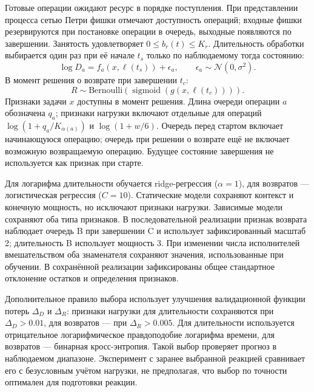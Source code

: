 \documentclass[runningheads]{llncs}
\begin{document}
Готовые операции ожидают ресурс в порядке поступления. При представлении процесса сетью Петри фишки отмечают доступность операций; входные фишки резервируются при постановке операции в очередь, выходные появляются по завершении. Занятость удовлетворяет $0\leq b_r(t)\leq K_r$. Длительность обработки выбирается один раз при её начале $t_s$ только по наблюдаемому тогда состоянию:
\begin{equation}\label{eq:duration}
\log D_a=f_a(x,\ell(t_s))+\epsilon_a,\qquad \epsilon_a\sim\mathcal N(0,\sigma^2).
\end{equation}
В момент решения о возврате при завершении $t_c$:
\begin{equation}\label{eq:return}
R\sim\mathrm{Bernoulli}\!\left(\operatorname{sigmoid}(g(x,\ell(t_c)))\right).
\end{equation}
Признаки задачи $x$ доступны в момент решения. Длина очереди операции $a$ обозначена $q_a$; признаки нагрузки включают отдельные для операций $\log(1+q_a/K_{\alpha(a)})$ и $\log(1+w/6)$. Очередь перед стартом включает начинающуюся операцию; очередь при решении о возврате ещё не включает возможную возвращаемую операцию. Будущее состояние завершения не используется как признак при старте.

Для логарифма длительности обучается ridge-регрессия ($\alpha=1$), для возвратов --- логистическая регрессия ($C=10$). Статические модели сохраняют контекст и конечную мощность, но исключают признаки нагрузки. Зависимые модели сохраняют оба типа признаков. В последовательной реализации признак возврата наблюдает очередь B при завершении C и использует зафиксированный масштаб 2; длительность B использует мощность 3. При изменении числа исполнителей вмешательством оба знаменателя сохраняют значения, использованные при обучении. В сохранённой реализации зафиксированы общее стандартное отклонение остатков и определения признаков.

Дополнительное правило выбора использует улучшения валидационной функции потерь $\Delta_D$ и $\Delta_R$: признаки нагрузки для длительности сохраняются при $\Delta_D>0.01$, для возвратов --- при $\Delta_R>0.005$. Для длительности используется отрицательное логарифмическое правдоподобие логарифма времени, для возвратов --- бинарная кросс-энтропия. Такой выбор проверяет прогноз в наблюдаемом диапазоне. Эксперимент с заранее выбранной реакцией сравнивает его с безусловным учётом нагрузки, не предполагая, что выбор по точности оптимален для подготовки реакции.
\end{document}
